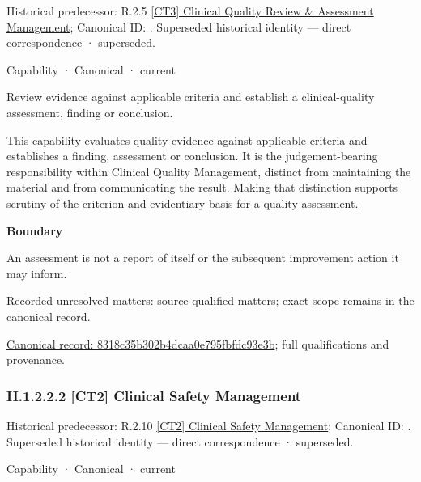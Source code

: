 {\small Historical predecessor: R.2.5 \hyperref[element:4b17ec92f0af4c4b9556912dbdd0f29f]{[CT3] Clinical Quality Review \& Assessment Management}; Canonical ID: \texttt{}. Superseded historical identity — direct correspondence · superseded.}\par
\label{element:8318c35b302b4dcaa0e795fbfdc93e3b}
{\small Capability · Canonical · current}\par

Review evidence against applicable criteria and establish a clinical-quality assessment, finding or conclusion.



This capability evaluates quality evidence against applicable criteria and establishes a finding, assessment or conclusion. It is the judgement-bearing responsibility within Clinical Quality Management, distinct from maintaining the material and from communicating the result. Making that distinction supports scrutiny of the criterion and evidentiary basis for a quality assessment.



\textbf{Boundary}



An assessment is not a report of itself or the subsequent improvement action it may inform.


{\small Recorded unresolved matters: source-qualified matters; exact scope remains in the canonical record.}\par
{\footnotesize \href{../../../../../../../continuum/strategy/capability/8318c35b302b4dcaa0e795fbfdc93e3b.md}{Canonical record: 8318c35b302b4dcaa0e795fbfdc93e3b}; full qualifications and provenance.}\par
\subsubsection*{II.1.2.2.2 [CT2] Clinical Safety Management}
\label{navigation:II.1.2.2.2}

{\small Historical predecessor: R.2.10 \hyperref[element:650ccec030fa46cc8c9d6b508a841778]{[CT2] Clinical Safety Management}; Canonical ID: \texttt{}. Superseded historical identity — direct correspondence · superseded.}\par
\label{element:28d1bf3e514e4c29837ebedaf9e4917b}
{\small Capability · Canonical · current}\par

